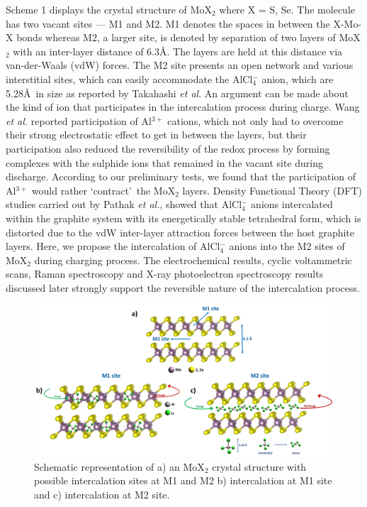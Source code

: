 \documentclass[num-refs]{wiley-article}
\begin{document}
Scheme 1 displays the crystal structure of MoX$_2$ where X = S, Se. The molecule has two vacant sites --- M1 and M2. M1 denotes the spaces in between the X-Mo-X bonds whereas M2, a larger site, is denoted by separation of two layers of MoX$_2$ with an inter-layer distance of 6.3\AA. The layers are held at this distance via van-der-Waals (vdW) forces. The M2 site presents an open network and various interstitial sites, which can easily accommodate the AlCl$_4^{-}$ anion, which are 5.28\AA\ in size as reported by Takahashi {\it et al}. An argument can be made about the kind of ion that participates in the intercalation process during charge. Wang {\it et al.} reported participation of Al$^{3+}$ cations, which not only had to overcome their strong electrostatic effect to get in between the layers, but their participation also reduced the reversibility of the redox process by forming complexes with the sulphide ions that remained in the vacant site during discharge. According to our preliminary tests, we found that the participation of Al$^{3+}$ would rather \lq contract\rq\ the MoX$_2$ layers. Density Functional Theory (DFT) studies carried out by Pathak {\it et al.}, showed that AlCl$_4^-$ anions intercalated within the graphite system with its energetically stable tetrahedral form, which is distorted due to the vdW inter-layer attraction forces between the host graphite layers. Here, we propose the intercalation of AlCl$_4^-$ anions into the M2 sites of MoX$_2$ during charging process. The electrochemical results, cyclic voltammetric scans, Raman spectroscopy and X-ray photoelectron spectroscopy results discussed later strongly support the reversible nature of the intercalation process.

\begin{figure}[t]
\centering
\includegraphics[width=\textwidth]{figures/scheme1}
\caption{Schematic representation of a) an MoX$_2$ crystal structure with possible intercalation sites at M1 and M2 b) intercalation at M1 site and c) intercalation at M2 site.}
\end{figure}
\end{document}
